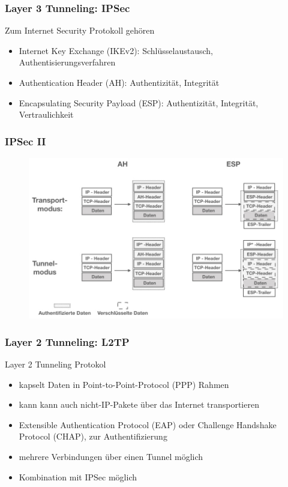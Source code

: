 \documentclass[hyperref={pdfpagelabels=false},xcolor=dvipsnames]{beamer}
\newcommand*\mi{ \item[\color{gray}\scalebox{1.2}{\textbullet}]}
\begin{document}
\begin{frame}
	\frametitle{Layer 3 Tunneling: IPSec }
	Zum Internet Security Protokoll gehören
	\begin{itemize}
		\mi	Internet Key Exchange (IKEv2): Schlüsselaustausch, Authentisierungsverfahren 
		\mi Authentication Header (AH): Authentizität, Integrität
		\mi Encapsulating
Security Payload (ESP): Authentizität, Integrität, Vertraulichkeit
		
	\end{itemize}	
\end{frame}

\begin{frame}
	\frametitle{IPSec II}
	\begin{figure}
		\includegraphics[width=\textwidth]{ahsep.001.jpeg}	
	\end{figure}	
\end{frame}

\begin{frame}
	\frametitle{Layer 2 Tunneling: L2TP}
	\begin{block}{Layer 2 Tunneling Protokol}
	\begin{itemize}
		\mi kapselt Daten in Point-to-Point-Protocol (PPP) Rahmen
		\mi kann kann auch nicht-IP-Pakete über das Internet transportieren	
		\mi Extensible Authentication
Protocol (EAP) oder Challenge Handshake Protocol (CHAP), zur Authentifizierung
		\mi mehrere Verbindungen über einen Tunnel möglich
		\mi Kombination mit IPSec möglich 
		
	\end{itemize}
	\end{block}
		 
\end{frame}
\end{document}

